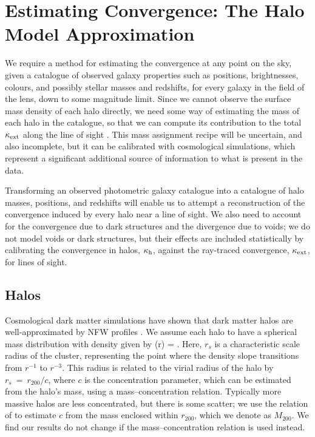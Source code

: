 \documentclass[useAMS,usenatbib,a4paper]{mn2e}
\begin{document}

\section{Estimating Convergence: The Halo Model Approximation}
\label{sec:model}

We require a method for estimating the convergence at any point on the sky,
given a catalogue of observed galaxy properties such as positions,
brightnesses, colours, and possibly stellar masses and redshifts, for every
galaxy in the field of the lens, down to some magnitude limit. Since we cannot
observe the surface mass density of each halo directly, we need some way of
estimating the mass of each halo in the catalogue, so that we can compute its
contribution to the total $\kappa_{\rm ext}$ along the line of sight \citep[as in
\eg][]{GunnarssonEtal2006,KarpenkaEtal2012}.  This mass
assignment recipe will be uncertain, and also incomplete, but it can be
calibrated with cosmological simulations, which represent a significant
additional source of information to what is present in the data.

Transforming an observed photometric galaxy catalogue into a  catalogue of
halo masses, positions, and redshifts will enable us to attempt a
reconstruction of the convergence induced by every halo near a line of sight. 
We also need to account for the convergence due to dark structures and the
divergence due to voids; we do not model voids or dark structures, but their
effects are included statistically by calibrating the convergence in
halos, $\kappa_{\rm h}$, against the ray-traced convergence, $\kappa_{\rm ext}$, for \MS lines
of sight.



\subsection{Halos}
\label{sec:model:halos}

Cosmological dark matter simulations have shown that dark matter
halos are well-approximated by NFW profiles 
\citep{NFW}. We assume each halo to have a spherical mass distribution with 
density given by
\be\label{eq:rhonfw}
\rho(r) = 
.
\ee
Here, $r_{s}$ is a characteristic scale 
radius of the cluster, representing the point where
the density slope transitions from $r^{-1}$ to $r^{-3}$. This radius is
related to the virial radius of the halo by $r_{s}~=~r_{200}/c$, where $c$ is
the concentration parameter, which can be estimated from the halo's mass,
using a mass--concentration relation. Typically more massive halos are less
concentrated, but there is some scatter; we use the relation of
\citet{Neto2007} to estimate $c$ from the mass enclosed within $r_{200}$,
which we denote as $M_{200}$. We find our results do not change if the
\citet{MaccioEtal2008} mass--concentration relation is used instead. 
\end{document}
